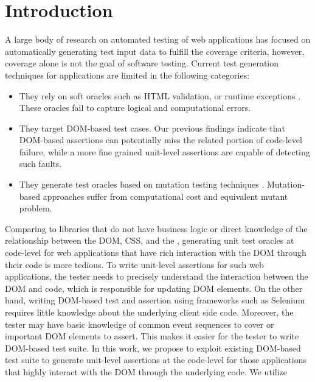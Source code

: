 \section{Introduction} \label{Sec:intro}
A large body of research on automated testing of \javascript web applications has focused on automatically generating test input data to fulfill the coverage criteria, however, coverage alone is not the goal of software testing.
Current test generation techniques for \javascript applications are limited in the following categories:
\begin{itemize}
\item They rely on soft oracles such as HTML validation, or runtime exceptions \cite{artzi:icse11}. These oracles fail to capture logical and computational errors. 
\item They target DOM-based test cases. Our previous findings\cite{mirshokraie:icst15} indicate that DOM-based assertions can potentially miss the related portion of
code-level failure, while a more fine grained unit-level assertions are capable of detecting such faults.
\item They generate test oracles based on mutation testing techniques \cite{mirshokraie:icst15, fraser:tse12}. Mutation-based approaches suffer from computational cost and equivalent mutant problem.
\end{itemize}
Comparing to \javascript libraries that do not have business logic or direct knowledge of the relationship between the DOM, CSS, and the \javascript, generating unit test oracles  
at \javascript code-level for web applications that have rich interaction with the DOM through their \javascript code is more tedious. To write unit-level assertions for such web applications, the tester needs to precisely understand the interaction between the DOM and \javascript code, which is responsible for updating DOM elements. On the other hand,
writing DOM-based test and assertion using frameworks such as Selenium
requires little knowledge about the underlying client side code. Moreover, the tester may have basic knowledge of common event sequences to cover or important DOM elements to assert. This makes it easier for the tester to write DOM-based test suite.
In this work, we propose to exploit existing DOM-based test suite to generate unit-level assertions at the \javascript code-level for those applications that highly interact with the DOM through the underlying \javascript code. We utilize
